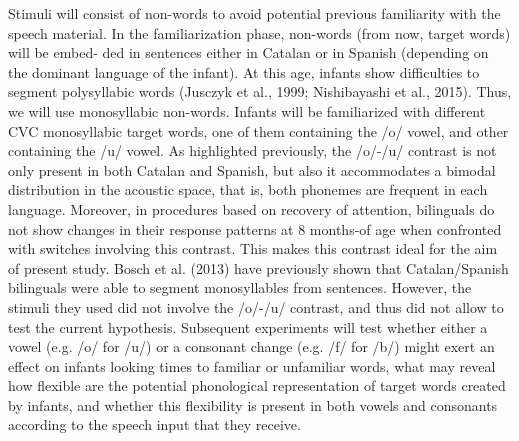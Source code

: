 \documentclass[man,floatsintext]{apa6}
\begin{document}
Stimuli will consist of non-words to avoid potential previous familiarity with the speech material. In the familiarization phase, non-words (from now, target words) will be embed- ded in sentences either in Catalan or in Spanish (depending on the dominant language of the infant). At this age, infants show difficulties to segment polysyllabic words (Jusczyk et al., 1999; Nishibayashi et al., 2015). Thus, we will use monosyllabic non-words. Infants will be familiarized with different CVC monosyllabic target words, one of them containing the /o/ vowel, and other containing the /u/ vowel. As highlighted previously, the /o/-/u/ contrast is not only present in both Catalan and Spanish, but also it accommodates a bimodal distribution in the acoustic space, that is, both phonemes are frequent in each language. Moreover, in procedures based on recovery of attention, bilinguals do not show changes in their response patterns at 8 months-of age when confronted with switches involving this contrast. This makes this contrast ideal for the aim of present study. Bosch et al. (2013) have previously shown that Catalan/Spanish bilinguals were able to segment monosyllables from sentences. However, the stimuli they used did not involve the /o/-/u/ contrast, and thus did not allow to test the current hypothesis. Subsequent experiments will test whether either a vowel (e.g. /o/ for /u/) or a consonant change (e.g. /f/ for /b/) might exert an effect on infants looking times to familiar or unfamiliar words, what may reveal how flexible are the potential phonological representation of target words created by infants, and whether this flexibility is present in both vowels and consonants according to the speech input that they receive.
\end{document}
